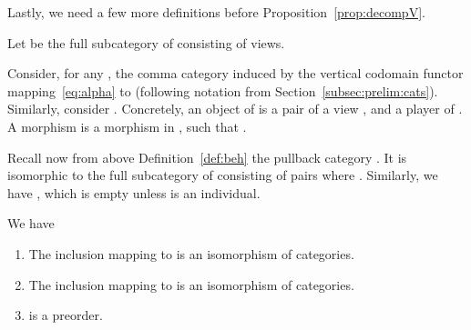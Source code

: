 \documentclass{LMCS}
\theoremstyle{plain}\newtheorem{satz}[thm]{Satz}
\begin{document}
Lastly, we need a few more definitions before
Proposition~\ref{prop:decompV}.
\begin{defi}
  Let  be the full subcategory of  consisting of views.
\end{defi}

Consider, for any , the comma category  induced by the
vertical codomain functor 
mapping~\eqref{eq:alpha} to  (following notation from
Section~\ref{subsec:prelim:cats}).  Similarly, consider .
Concretely, an object of  is a pair of a view , and a player  of .  A morphism
 is a morphism  in , such that .  

Recall now from above Definition~\ref{def:beh} the pullback category
. It is isomorphic to the full subcategory of 
consisting of pairs  where .  Similarly, we have
, which is empty unless  is an individual.
   \begin{prop}\label{prop:decompV} We have
     \begin{enumerate}[label=(\roman*)]
     \item The inclusion  mapping  to 
        is an isomorphism of categories. \label{prop:decompV:i}
     \item The inclusion  mapping  to  is an isomorphism of
       categories.
       \label{prop:decompV:ii}
     \item  is a preorder.\label{prop:decompV:iii}
     \end{enumerate}
\end{prop}
\end{document}
